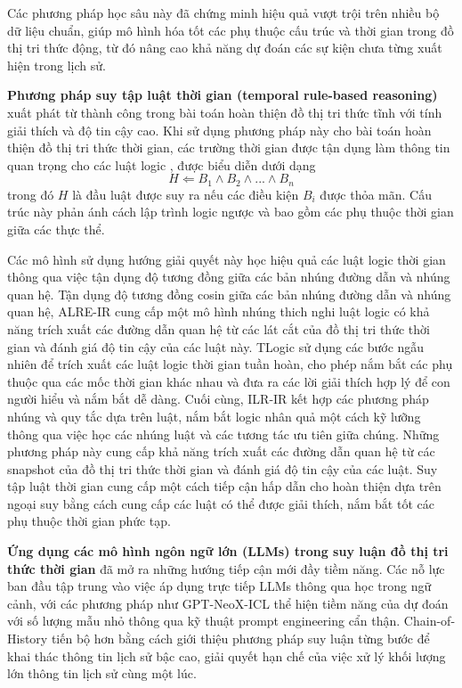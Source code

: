 Các phương pháp học sâu này đã chứng minh hiệu quả vượt trội trên nhiều bộ dữ liệu chuẩn, giúp mô hình hóa tốt các phụ thuộc cấu trúc và thời gian trong đồ thị tri thức động, từ đó nâng cao khả năng dự đoán các sự kiện chưa từng xuất hiện trong lịch sử.

\textbf{Phương pháp suy tập luật thời gian (temporal rule-based reasoning)} xuất phát từ thành công trong bài toán hoàn thiện đồ thị tri thức tĩnh với tính giải thích và độ tin cậy cao. Khi sử dụng phương pháp này cho bài toán hoàn thiện đồ thị tri thức thời gian, các trường thời gian được tận dụng làm thông tin quan trọng cho các luật logic \cite{ref_article23}, được biểu diễn dưới dạng 
\[
H \Leftarrow B_1 \wedge B_2 \wedge ... \wedge B_n
\]
trong đó $H$ là đầu luật được suy ra nếu các điều kiện $B_i$ được thỏa mãn. Cấu trúc này phản ánh cách lập trình logic ngược và bao gồm các phụ thuộc thời gian giữa các thực thể.

Các mô hình sử dụng hướng giải quyết này học hiệu quả các luật logic thời gian thông qua việc tận dụng độ tương đồng giữa các bản nhúng đường dẫn và nhúng quan hệ. Tận dụng độ tương đồng cosin giữa các bản nhúng đường dẫn và nhúng quan hệ, ALRE-IR \cite{ref_article34} cung cấp một mô hình nhúng thich nghi luật logic có khả năng trích xuất các đường dẫn quan hệ từ các lát cắt của đồ thị tri thức thời gian và đánh giá độ tin cậy của các luật này. TLogic \cite{ref_article23} sử dụng các bước ngẫu nhiên để trích xuất các luật logic thời gian tuần hoàn, cho phép nắm bắt các phụ thuộc qua các mốc thời gian khác nhau và đưa ra các lời giải thích hợp lý để con người hiểu và nắm bắt dễ dàng. Cuối cùng, ILR-IR \cite{ref_article35} kết hợp các phương pháp nhúng và quy tắc dựa trên luật, nắm bắt logic nhân quả một cách kỹ lưỡng thông qua việc học các nhúng luật và các tương tác ưu tiên giữa chúng. Những phương pháp này cung cấp khả năng trích xuất các đường dẫn quan hệ từ các snapshot của đồ thị tri thức thời gian và đánh giá độ tin cậy của các luật. Suy tập luật thời gian cung cấp một cách tiếp cận hấp dẫn cho hoàn thiện dựa trên ngoại suy bằng cách cung cấp các luật có thể được giải thích, nắm bắt tốt các phụ thuộc thời gian phức tạp.


\textbf{Ứng dụng các mô hình ngôn ngữ lớn (LLMs) trong suy luận đồ thị tri thức thời gian} đã mở ra những hướng tiếp cận mới đầy tiềm năng. Các nỗ lực ban đầu tập trung vào việc áp dụng trực tiếp LLMs thông qua học trong ngữ cảnh, với các phương pháp như GPT-NeoX-ICL \cite{ref_article08} thể hiện tiềm năng của dự đoán với số lượng mẫu nhỏ thông qua kỹ thuật prompt engineering cẩn thận. Chain-of-History \cite{ref_article09} tiến bộ hơn bằng cách giới thiệu phương pháp suy luận từng bước để khai thác thông tin lịch sử bậc cao, giải quyết hạn chế của việc xử lý khối lượng lớn thông tin lịch sử cùng một lúc.

